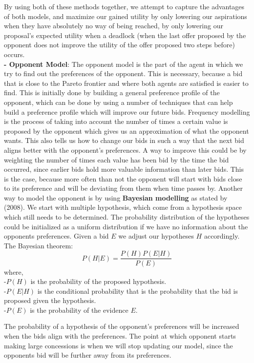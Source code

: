 \documentclass{article}
\begin{document}
\begin{enumerate}[label=(\alph*)]
\quad By using both of these methods together, we attempt to capture the advantages of both models, and maximize our gained utility by only lowering our aspirations when they have absolutely no way of being reached, by only lowering our proposal's expected utility when a deadlock (when the last offer proposed by the opponent does not improve the utility of the offer proposed two steps before) occurs.\\
 
\textbf{- Opponent Model}: The opponent model is the part of the agent in which we try to find out the preferences of the opponent. This is necessary, because a bid that is close to the Pareto frontier and where both agents are satisfied is easier to find. This is initially done by building a general preference profile of the opponent, which can be done by using a number of techniques that can help build a preference profile which will improve our future bids. Frequency modelling is the process of taking into account the number of times a certain value is proposed by the opponent which gives us an approximation of what the opponent wants. This also tells us how to change our bids in such a way that the next bid aligns better with the opponent's preferences. A way to improve this could be by weighting the number of times each value has been bid by the time the bid occurred, since earlier bids hold more valuable information than later bids. This is the case, because more often than not the opponent will start with bids close to its preference and will be deviating from them when time passes by. Another way to model the opponent is by using \textbf{Bayesian modelling} as stated by \cite{hindriks2008opponent} (2008). We start with multiple hypothesis, which come from a hypothesis space which still needs to be determined. The probability distribution of the hypotheses could be initialized as a uniform distribution if we have no information about the opponents preferences. Given a bid $E$ we adjust our hypotheses $H$ accordingly.
The Bayesian theorem:
$$
P(H|E) =  \frac{P(H)P(E|H)}{P(E)}
$$
where,\\
\quad -$P(H)$ is the probability of the proposed hypothesis.\\
\quad -$P(E|H)$ is the conditional probability that is the probability that the bid is proposed given the hypothesis.  \\
\quad -$P(E)$ is the probability of the evidence $E$.

\quad The probability of a hypothesis of the opponent's preferences will be increased when the bids align with the preferences.
The point at which opponent starts making large concessions is when we will stop updating our model, since the opponents bid will be further away from its preferences.



\end{enumerate}
\end{document}
